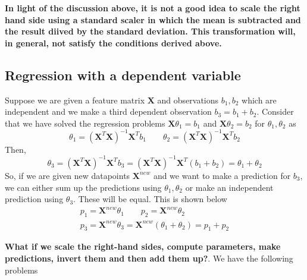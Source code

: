 \documentclass{article}
\newcommand{\beq}{\begin{equation}}
\newcommand{\eeq}{\end{equation}}
\newcommand{\ber}{\begin{eqnarray}}
\newcommand{\eer}{\end{eqnarray}}
\begin{document}
\textbf{In light of the discussion above, it is not a good idea to scale the right hand side using a standard scaler in which the mean is subtracted and the result diived by the standard deviation. This transformation will, in general, not satisfy the conditions derived above.}

\subsection{Regression with a dependent variable}
Suppose we are given a feature matrix $\pmb{X}$ and observations $b_1,b_2$ which are independent and we make a third dependent observation $b_3=b_1+b_2$. Consider that we have solved the regression problems $\pmb{X}\theta_1=b_1$ and $\pmb{X}\theta_2=b_2$ for $\theta_1,\theta_2$ as
\beq
\theta_1 = (\pmb{X}^T\pmb{X})^{-1}\pmb{X}^Tb_1 \qquad \theta_2 = (\pmb{X}^T\pmb{X})^{-1}\pmb{X}^Tb_2
\eeq
Then,
\beq
\theta_3 = (\pmb{X}^T\pmb{X})^{-1}\pmb{X}^Tb_3 =(\pmb{X}^T\pmb{X})^{-1}\pmb{X}^T(b_1+b_2)  = \theta_1 + \theta_2
\eeq
So, if we are given new datapoints $\pmb{X}^{new}$ and we want to make a prediction for $b_3$, we can either sum up the predictions using $\theta_1,\theta_2$ or make an independent prediction using $\theta_3$. These will be equal. This is shown below
\ber
p_1 = \pmb{X}^{new}\theta_1 \qquad p_2 = \pmb{X}^{new}\theta_2\\
p_3 = \pmb{X}^{new}\theta_3 = \pmb{X}^{new}(\theta_1+\theta_2) = p_1 + p_2
\eer

\textbf{What if we scale the right-hand sides, compute parameters, make predictions, invert them and then add them up?}.  We have the following problems
\end{document}
